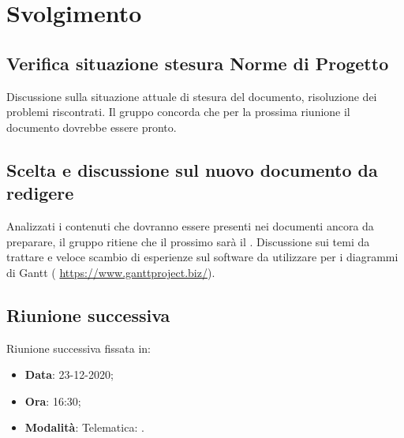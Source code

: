 \documentclass[]{article}
\begin{document}
	\newpage

	\section{Svolgimento}
		\subsection{Verifica situazione stesura Norme di Progetto}
		Discussione sulla situazione attuale di stesura del documento, risoluzione dei problemi riscontrati. Il gruppo concorda che per la prossima riunione il documento dovrebbe essere pronto.

		\subsection{Scelta e discussione sul nuovo documento da redigere}
		Analizzati i contenuti che dovranno essere presenti nei documenti ancora da preparare, il gruppo ritiene che il prossimo sarà il . Discussione sui temi da trattare e veloce scambio di esperienze sul software da utilizzare per i diagrammi di Gantt ( \url{https://www.ganttproject.biz/}).

		\subsection{Riunione successiva}
		Riunione successiva fissata in:
		\begin{itemize}
			\item \textbf{Data}: 23-12-2020;
			\item \textbf{Ora}: 16:30;
			\item \textbf{Modalità}: Telematica: .
		\end{itemize}
	
\end{document}
